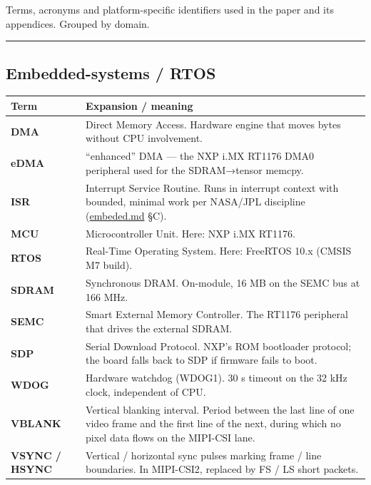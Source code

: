 Terms, acronyms and platform-specific identifiers used in the paper and
its appendices. Grouped by domain.

\begin{center}\rule{0.5\linewidth}{0.5pt}\end{center}

\subsection{Embedded-systems / RTOS}\label{embedded-systems-rtos}

{\def\LTcaptype{none} %
\begin{longtable}[]{@{}
  >{\raggedright\arraybackslash}p{}
  >{\raggedright\arraybackslash}p{}@{}}
\toprule\noalign{}
\begin{minipage}[b]{\linewidth}\raggedright
Term
\end{minipage} & \begin{minipage}[b]{\linewidth}\raggedright
Expansion / meaning
\end{minipage} \\
\midrule\noalign{}
\endhead
\bottomrule\noalign{}
\endlastfoot
\textbf{DMA} & Direct Memory Access. Hardware engine that moves bytes
without CPU involvement. \\
\textbf{eDMA} & ``enhanced'' DMA --- the NXP i.MX RT1176 DMA0 peripheral
used for the SDRAM→tensor memcpy. \\
\textbf{ISR} & Interrupt Service Routine. Runs in interrupt context with
bounded, minimal work per NASA/JPL discipline
(\href{../agent/embeded.md}{embeded.md} §C). \\
\textbf{MCU} & Microcontroller Unit. Here: NXP i.MX RT1176. \\
\textbf{RTOS} & Real-Time Operating System. Here: FreeRTOS 10.x (CMSIS
M7 build). \\
\textbf{SDRAM} & Synchronous DRAM. On-module, 16 MB on the SEMC bus at
166 MHz. \\
\textbf{SEMC} & Smart External Memory Controller. The RT1176 peripheral
that drives the external SDRAM. \\
\textbf{SDP} & Serial Download Protocol. NXP's ROM bootloader protocol;
the board falls back to SDP if firmware fails to boot. \\
\textbf{WDOG} & Hardware watchdog (WDOG1). 30 s timeout on the 32 kHz
clock, independent of CPU. \\
\textbf{VBLANK} & Vertical blanking interval. Period between the last
line of one video frame and the first line of the next, during which no
pixel data flows on the MIPI-CSI lane. \\
\textbf{VSYNC / HSYNC} & Vertical / horizontal sync pulses marking frame
/ line boundaries. In MIPI-CSI2, replaced by FS / LS short packets. \\
\end{longtable}
}

